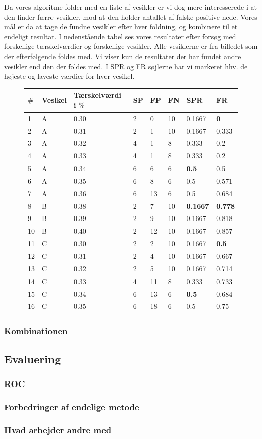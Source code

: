 Da vores algoritme folder med en liste af vesikler er vi dog mere interesserede i at den finder færre vesikler, mod at den holder antallet af falske positive nede. Vores mål er da at tage de fundne vesikler efter hver foldning, og kombinere til et endeligt resultat. I nedenstående tabel ses vores resultater efter forsøg med forskellige tærskelværdier og forskellige  vesikler. Alle vesiklerne er fra billedet som der efterfølgende foldes med. Vi viser kun de resultater der har fundet andre vesikler end den der foldes med. I SPR og FR søjlerne har vi markeret hhv. de højeste og laveste værdier for hver vesikel.
\begin{figure}
	\centering
\begin{tabular}{l|l|l|l|l|l|l|l}
	$\#$ & Vesikel & Tærskelværdi i $\%$ & SP & FP & FN & SPR & FR \\\hline
	1	&	A	&	0.30	& 2		& 0		&10 &0.1667 &\textbf{0}\\\hline
	2	&	A	&	0.31	& 2		& 1		&10 &0.1667 &0.333\\\hline
	3	&	A	&	0.32	& 4		& 1		&8  &0.333 	&0.2\\\hline
	4	&	A	&	0.33	& 4		& 1		&8  &0.333 	&0.2\\\hline
	5	&	A	&	0.34	& 6		& 6		&6  &\textbf{0.5} 	&0.5\\\hline
	6	&	A	&	0.35	& 6		& 8		&6  &0.5 	&0.571\\\hline
	7	&	A	&	0.36	& 6		& 13	&6  &0.5	&0.684\\\hline
	8	&	B	&	0.38	& 2		& 7		&10 &\textbf{0.1667} &\textbf{0.778}\\\hline
	9	&	B	&	0.39	& 2		& 9		&10 &0.1667 &0.818\\\hline
	10	&	B	&	0.40	& 2		& 12	&10 &0.1667 &0.857\\\hline
	11	&	C	&	0.30	& 2		& 2		&10 &0.1667	&\textbf{0.5}\\\hline
	12	&	C	&	0.31	& 2		& 4		&10 &0.1667	&0.667\\\hline
	13	&	C	&	0.32	& 2		& 5		&10 &0.1667	&0.714\\\hline
	14	&	C	&	0.33	& 4		& 11	&8 	&0.333 	&0.733\\\hline
	15	&	C	&	0.34	& 6		& 13	&6 	&\textbf{0.5} 	&0.684\\\hline
	16	&	C	&	0.35	& 6		& 18	&6 	&0.5 	&0.75
\end{tabular} 
\end{figure}




\subsubsection{Kombinationen} %
\subsection{Evaluering}
\subsubsection{ROC}
\subsubsection{Forbedringer af endelige metode}
\subsubsection{Hvad arbejder andre med} %
